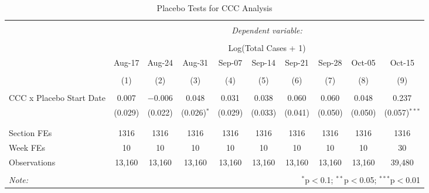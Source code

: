 
\begin{table}[!htbp] \centering 
  \caption{Placebo Tests for CCC Analysis} 
  \label{tab:did-ccc-placebo} 
\begin{tabular}{@{\extracolsep{0pt}}lccccccccc} 
\\[-1.8ex]\hline 
\hline \\[-1.8ex] 
 & \multicolumn{9}{c}{\textit{Dependent variable:}} \\ 
\cline{2-10} 
\\[-1.8ex] & \multicolumn{9}{c}{Log(Total Cases + 1)} \\ 
 & Aug-17 & Aug-24 & Aug-31 & Sep-07 & Sep-14 & Sep-21 & Sep-28 & Oct-05 & Oct-15 \\ 
\\[-1.8ex] & (1) & (2) & (3) & (4) & (5) & (6) & (7) & (8) & (9)\\ 
\hline \\[-1.8ex] 
 CCC x Placebo Start Date & 0.007 & $-$0.006 & 0.048 & 0.031 & 0.038 & 0.060 & 0.060 & 0.048 & 0.237 \\ 
  & (0.029) & (0.022) & (0.026)$^{*}$ & (0.029) & (0.033) & (0.041) & (0.050) & (0.050) & (0.057)$^{***}$ \\ 
  & & & & & & & & & \\ 
\hline \\[-1.8ex] 
Section FEs & 1316 & 1316 & 1316 & 1316 & 1316 & 1316 & 1316 & 1316 & 1316 \\ 
Week FEs & 10 & 10 & 10 & 10 & 10 & 10 & 10 & 10 & 30 \\ 
Observations & 13,160 & 13,160 & 13,160 & 13,160 & 13,160 & 13,160 & 13,160 & 13,160 & 39,480 \\ 
\hline 
\hline \\[-1.8ex] 
\textit{Note:}  & \multicolumn{9}{r}{$^{*}$p$<$0.1; $^{**}$p$<$0.05; $^{***}$p$<$0.01} \\ 
\end{tabular} 
\end{table} 
